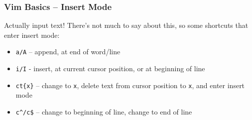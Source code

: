 \documentclass{beamer}
\begin{document}
\begin{frame}
  \frametitle{Vim Basics -- Insert Mode}
  Actually input text! There's not much to say about this, so some shortcuts that enter insert mode:
  \begin{itemize}
    \item \texttt{a/A} -- append, at end of word/line
    \item \texttt{i/I} - insert, at current cursor position, or at beginning of line
    \item \texttt{ct\{x\}} -- change to \texttt{x}, delete text from cursor position to \texttt{x}, and enter insert mode
    \item \texttt{c\^{}/c\$} -- change to beginning of line, change to end of line
  \end{itemize}
\end{frame}
\end{document}
